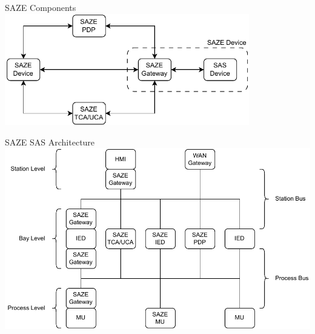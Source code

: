 \documentclass[en]{sdqbeamer}
\begin{document}
\begin{frame}{SAZE Components}
    \centering
	\includegraphics[width=0.8\textwidth]{./figures/saze_components.drawio.pdf}
\end{frame}

\begin{frame}{SAZE SAS Architecture}
    \centering
    \includegraphics[height=0.75\textheight]{./figures/saze_architecture.drawio.pdf}
\end{frame}
\end{document}
